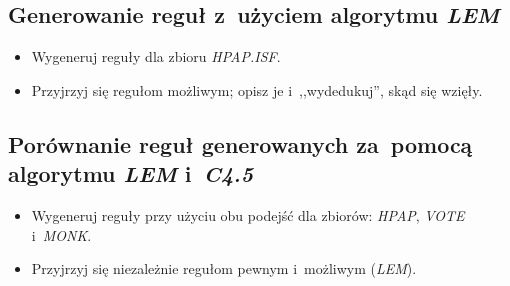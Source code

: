 \subsection{Generowanie reguł z~użyciem algorytmu \emph{LEM}}

\begin{itemize}
\item Wygeneruj reguły dla zbioru \emph{HPAP.ISF}.
\item Przyjrzyj się regułom możliwym; opisz je i~,,wydedukuj'', skąd się wzięły.
\end{itemize}

\subsection{Porównanie reguł generowanych za~pomocą algorytmu \emph{LEM} i~\emph{C4.5}}

\begin{itemize}
\item Wygeneruj reguły przy użyciu obu podejść dla zbiorów: \emph{HPAP}, \emph{VOTE} i~\emph{MONK}.
\item Przyjrzyj się niezależnie regułom pewnym i~możliwym (\emph{LEM}).
\end{itemize}

